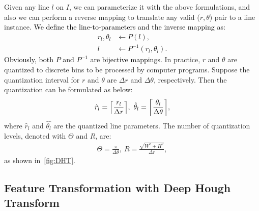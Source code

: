 \documentclass[10pt,journal,cspaper,compsoc]{IEEEtran}
\DeclarePairedDelimiter\ceil{\lceil}{\rceil}
\newcommand{\revise}[1]{{\textcolor{black}{#1}}}
\begin{document}
Given any line $l$ on $I$, we can parameterize it with the above formulations,
and also we can perform a reverse mapping to translate any valid
($r, \theta$) pair to a line instance.
%
\revise{We define the line-to-parameters and the inverse mapping
as:
\begin{equation}
\begin{split}
  r_l, \theta_l &\leftarrow P(l), \\
  l             &\leftarrow P^{-1}(r_l, \theta_l).
  \label{eq:parameterize}
\end{split}
\end{equation}
Obviously, both $P$ and $P^{-1}$ are bijective mappings.}
%
In practice, $r$ and $\theta$ are quantized to discrete bins to be processed by computer programs.
%
Suppose the quantization interval for $r$ and $\theta$ are $\Delta r$ and $\Delta \theta$, respectively.
%
Then the quantization can be formulated as below:
\begin{equation}
  \begin{split}
    \hat{r}_l = \ceil*{\frac{r_l}{\Delta r}}, \
    \hat{\theta}_l = \ceil*{\frac{\theta_l}{\Delta \theta}},
  \end{split}\label{eq:quantization}
\end{equation}
where $\hat{r}_l$ and $\hat{\theta_l}$ are the quantized line parameters.
%
The number of quantization levels, denoted with $\Theta$ and $R$, are:
\begin{equation}
  \begin{split}
    \Theta = \frac{\pi}{\Delta \theta}, \
    R = \frac{\sqrt{W^2+H^2}}{\Delta r},
  \end{split}\label{eq:grid-size}
\end{equation}
as shown in~\cref{fig:DHT}.

\subsection{Feature Transformation with Deep Hough Transform} \label{sec:dht-dht}
\end{document}
